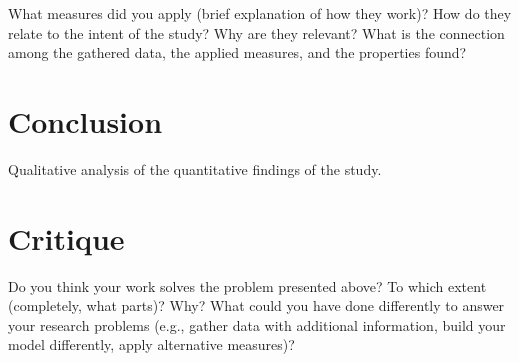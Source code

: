 \documentclass[12pt, a4paper]{article}
\begin{document}
What measures did you apply (brief explanation of how they work)? How do
they relate to the intent of the study? Why are they relevant? What is the connection among the gathered data, the applied measures,
and the properties found?

\section{Conclusion}
\label{conclusion}

Qualitative analysis of the quantitative findings of the study.

\section{Critique}
\label{critique}

Do you think your work solves the problem presented above? To which
extent (completely, what parts)? Why? What could you have done
differently to answer your research problems (e.g., gather data with
additional information, build your model differently, apply alternative
measures)?



\end{document}
